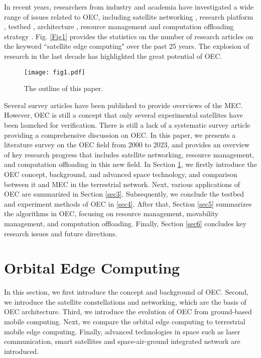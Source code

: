 \documentclass[lettersize,journal]{IEEEtran}
\begin{document}
In recent years, researchers from industry and academia have investigated a wide range of issues related to OEC, including satellite networking \cite{RN88}, research platform \cite{RN13}, testbed \cite{RN102}, architecture \cite{RN55, RN56}, resource management \cite{RN58} and computation offloading strategy \cite{RN16, RN43}. Fig. \ref{Fig1} provides the statistics on the number of research articles on the keyword ``satellite edge computing" over the past 25 years. The explosion of research in the last decade has highlighted the great potential of OEC. 

\begin{figure*}
  \centering
  \texttt{[image: fig1.pdf]}
  \caption[c]{The outline of this paper.}
  \label{Fig4}
\end{figure*}   

Several survey articles have been published to provide overviews of the MEC. However, OEC is still a concept that only several experimental satellites have been launched for verification. There is still a lack of a systematic survey article providing a comprehensive discussion on OEC. In this paper, we presents a literature survey on the OEC field from 2000 to 2023, and provides an overview of key research progress that includes satellite networking, resource management, and computation offloading in this new field. In Section \ref{sec2}, we firstly introduce the OEC concept, background, and advanced space technology, and comparison between it and MEC in the terrestrial network. Next, various applications of OEC are summarized in Section \ref{sec3}. Subsequently, we conclude the testbed and experiment methods of OEC in \ref{sec4}. After that, Section \ref{sec5} summarizes the algorithms in OEC, focusing on resource management, movability management, and computation offloading. Finally, Section \ref{sec6} concludes key research issues and future directions.

\section{Orbital Edge Computing}
\label{sec2}
In this section, we first introduce the concept and background of OEC. Second, we introduce the satellite constellations and networking, which are the basis of OEC architecture. Third, we introduce the evolution of OEC from ground-based mobile computing. Next, we compare the orbital edge computing to terrestrial mobile edge computing. Finally, advanced technologies in space such as laser communication, smart satellites and space-air-ground integrated network are introduced.
\end{document}
